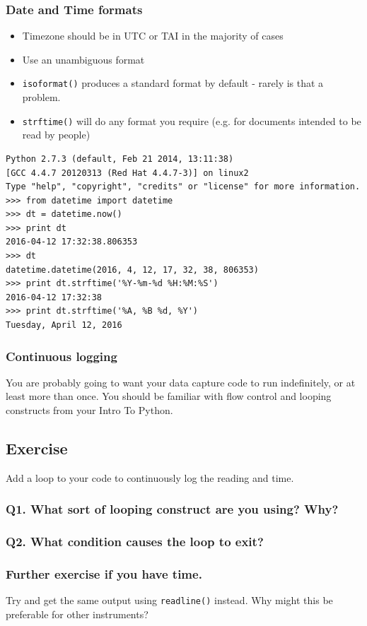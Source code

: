 \documentclass[aspectratio=1610,9pt]{beamer} %
\begin{document}
\begin{frame}[fragile]
\frametitle{Date and Time formats}

\begin{itemize}
\itemsep1pt\parskip0pt
\item
  Timezone should be in UTC or TAI in the majority of cases
\item
  Use an unambiguous format
\item
  \texttt{isoformat()} produces a standard format by default - rarely is
  that a problem.
\item
  \texttt{strftime()} will do any format you require (e.g. for documents
  intended to be read by people)
\end{itemize}

\begin{verbatim}
Python 2.7.3 (default, Feb 21 2014, 13:11:38) 
[GCC 4.4.7 20120313 (Red Hat 4.4.7-3)] on linux2
Type "help", "copyright", "credits" or "license" for more information.
>>> from datetime import datetime
>>> dt = datetime.now()
>>> print dt
2016-04-12 17:32:38.806353
>>> dt
datetime.datetime(2016, 4, 12, 17, 32, 38, 806353)
>>> print dt.strftime('%Y-%m-%d %H:%M:%S')
2016-04-12 17:32:38
>>> print dt.strftime('%A, %B %d, %Y')
Tuesday, April 12, 2016
\end{verbatim}

\end{frame}
\begin{frame}
\frametitle{Continuous logging}

You are probably going to want your data capture code to run
indefinitely, or at least more than once. You should be familiar with
flow control and looping constructs from your Intro To Python.

\subsection{Exercise}

Add a loop to your code to continuously log the reading and time.

\subsubsection{Q1. What sort of looping construct are you using?
Why?}

\subsubsection{Q2. What condition causes the loop to
exit?}

\subsubsection{Further exercise if you have
time.}

Try and get the same output using \texttt{readline()} instead. Why might
this be preferable for other instruments?

\end{frame}
\end{document}
